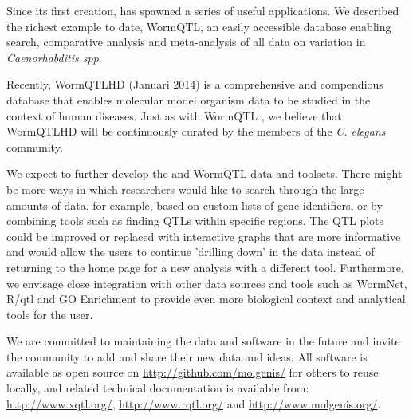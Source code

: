 Since its first creation, \xqtlwb has spawned a series of useful applications. We described 
the richest example to date, WormQTL, an easily accessible database enabling search, comparative
 analysis and meta-analysis of all data on variation in \emph{Caenorhabditis spp}. 

Recently, WormQTLHD (Januari 2014) is a comprehensive and compendious database that enables molecular 
model organism data to be studied in the context of human diseases. Just as with WormQTL \cite{Snoek:2012}, 
we believe that WormQTLHD will be continuously curated by the members of the \emph{C. elegans} community. 

We expect to further develop the \xqtlwb and WormQTL data and toolsets. There might be more ways in which 
researchers would like to search through the large amounts of data, for example, based on custom lists of 
gene identifiers, or by combining tools such as finding QTLs within specific regions. The QTL plots could 
be improved or replaced with interactive graphs that are more informative and would allow the users to 
continue 'drilling down' in the data instead of returning to the home page for a new analysis with a 
different tool. Furthermore, we envisage close integration with other data sources and tools such as WormNet, 
R/qtl and GO Enrichment to provide even more biological context and analytical tools for the user. 

We are committed to maintaining the data and software in the future and invite the community to add and 
share their new data and ideas. All software is available as open source on \url{http://github.com/molgenis/} 
for others to reuse locally, and related technical documentation is available from:\\ \url{http://www.xqtl.org/}, 
\url{http://www.rqtl.org/} and \url{http://www.molgenis.org/}.

